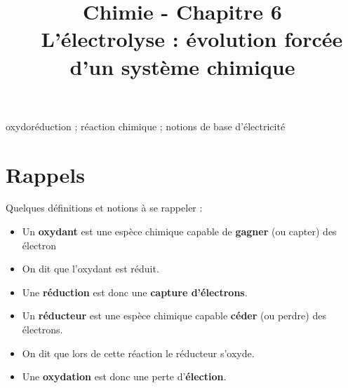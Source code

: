 \documentclass[11pt,a4paper]{article}
\title{\large Chimie - Chapitre 6 \\ \LARGE  L'électrolyse : évolution forcée d'un système chimique}
\date{}
\author{}
\begin{document}
\maketitle
\vspace{-1cm}
\begin{tcolorbox}[title=Notions de la classe de première à rappeler]
oxydoréduction ; réaction chimique ; notions de base d'électricité
\end{tcolorbox}
\tableofcontents

\section{Rappels}
Quelques définitions et notions à se rappeler : 
\begin{itemize}
    \item Un \textbf{oxydant} est une espèce chimique capable de \textbf{gagner} (ou capter) des électron 
    \item On dit que l’oxydant est réduit.  
    \item Une \textbf{réduction} est donc une \textbf{capture d’électrons}.
    \item Un \textbf{réducteur} est une espèce chimique capable \textbf{céder} (ou perdre) des électrons.
    \item On dit que lors de cette réaction le réducteur s’oxyde.  
    \item Une \textbf{oxydation} est donc une perte d’\textbf{élection}. 
\end{itemize}
\end{document}
